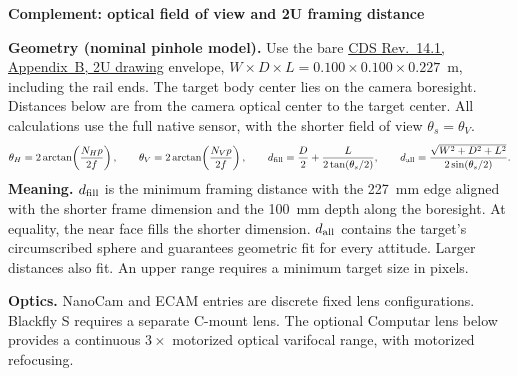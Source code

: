 \documentclass[10pt,a4paper,landscape]{article}
\begin{document}
\clearpage
{\large\bfseries Complement: optical field of view and 2U framing distance}\par
\smallskip
\small
\textbf{Geometry (nominal pinhole model).} Use the bare \href{https://www.cubesat.org/s/CDS-REV14_1-2022-02-09.pdf}{CDS Rev.~14.1, Appendix~B, 2U drawing} envelope, $W\times D\times L=0.100\times0.100\times0.227$~m, including the rail ends. The target body center lies on the camera boresight. Distances below are from the camera optical center to the target center. All calculations use the full native sensor, with the shorter field of view $\theta_s=\theta_V$.
\[
\theta_H=2\arctan\!\left(\frac{N_Hp}{2f}\right),\qquad
\theta_V=2\arctan\!\left(\frac{N_Vp}{2f}\right),\qquad
 d_{\rm fill}=\frac{D}{2}+\frac{L}{2\tan(\theta_s/2)},\qquad
 d_{\rm all}=\frac{\sqrt{W^2+D^2+L^2}}{2\sin(\theta_s/2)}.
\]
\textbf{Meaning.} $d_{\rm fill}$ is the minimum framing distance with the 227~mm edge aligned with the shorter frame dimension and the 100~mm depth along the boresight. At equality, the near face fills the shorter dimension. $d_{\rm all}$ contains the target's circumscribed sphere and guarantees geometric fit for every attitude. Larger distances also fit. An upper range requires a minimum target size in pixels.\par
\smallskip
\textbf{Optics.} NanoCam and ECAM entries are discrete fixed lens configurations. Blackfly S requires a separate C-mount lens. The optional Computar lens below provides a continuous $3\times$ motorized optical varifocal range, with motorized refocusing.
\end{document}
